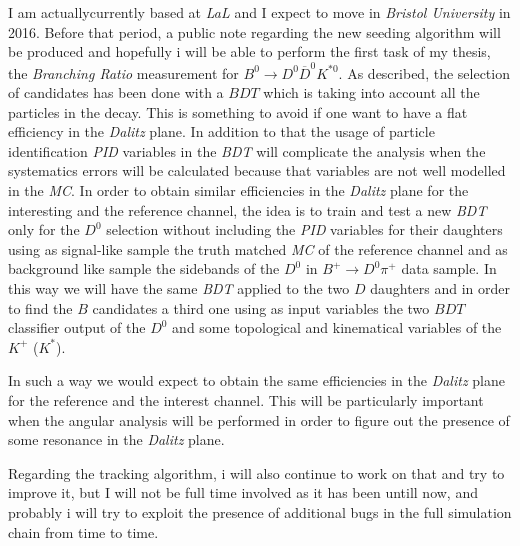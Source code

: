 \documentclass[paper=a4, fontsize=10pt]{scrartcl}
\numberwithin{equation}{section}		%
\numberwithin{figure}{section}			%
\numberwithin{table}{section}				%
\begin{document}
I am actuallycurrently based at \textit{LaL} and I expect to move in \textit{Bristol University} in 2016. Before that period, a public note regarding the new seeding algorithm will be produced and hopefully i will be able to perform the first task of my thesis, the \textit{Branching Ratio} measurement for $B^{0}\rightarrow D^{0}\overline{D}^{0}K^{\ast 0}$. As described, the selection of candidates has been done with a $BDT$ which is taking into account all the particles in the decay. This is something to avoid if one want to have a flat efficiency in the \textit{Dalitz} plane. In addition to that the usage of particle identification \textit{PID} variables in the \textit{BDT} will complicate the analysis when the systematics errors will be calculated because that variables are not well modelled in the \textit{MC}. In order to obtain similar efficiencies in the \textit{Dalitz} plane for the interesting and the reference channel, the idea is to train and test a new \textit{BDT} only for the $D^{0}$ selection without including the \textit{PID} variables for their daughters using as signal-like sample the truth matched \textit{MC} of the reference channel and as background like sample the sidebands of the $D^{0}$ in  $B^{+}\rightarrow D^{0} \pi^{+}$ data sample. In this way we will have the same \textit{BDT} applied to the two $D$ daughters and in order to find the $B$ candidates a third one using as input variables the two $BDT$ classifier output of the $D^{0}$ and some topological and kinematical variables of the $K^{+}$ ($K^{\ast}$). 

In such a way we would expect to obtain the same efficiencies in the \textit{Dalitz} plane for the reference and the interest channel. This will be particularly important when the angular analysis will be performed in order to figure out the presence of some resonance in the \textit{Dalitz} plane.

Regarding the tracking algorithm, i will also continue to work on that and try to improve it, but I will not be full time involved as it has been untill now, and probably i will try to exploit the presence of additional bugs in the full simulation chain from time to time.
\end{document}
